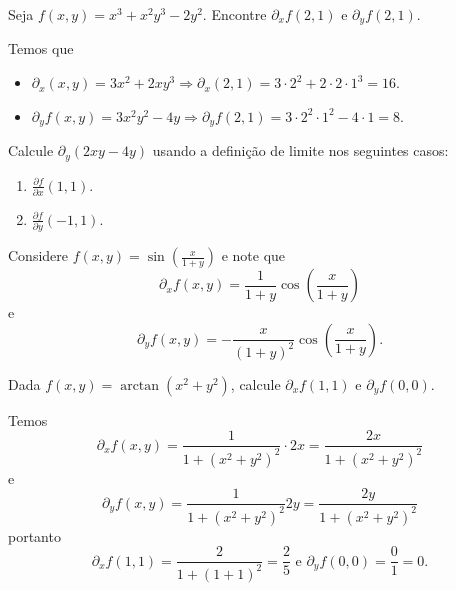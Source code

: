\begin{example}
    Seja \(f(x,y) = x^3 + x^2y^3 -2y^2\). Encontre \(\partial_xf(2,1)\) e \(\partial_yf(2,1)\).

    Temos que
        \begin{itemize}
            \item \(\partial_x(x,y) = 3x^2 + 2xy^3 \Rightarrow \partial_x(2,1) = 3\cdot2^2 + 2\cdot2\cdot1^3 = 16.\)
            \item \(\partial_yf(x,y) = 3x^2y^2 - 4y \Rightarrow \partial_yf(2,1) = 3\cdot2^2\cdot1^2 - 4\cdot1 = 8.\)
        \end{itemize}
\end{example}

\begin{exercise}
    Calcule \(\partial_y (2xy - 4y)\) usando a definição de limite nos seguintes casos:
        \begin{enumerate}
            \item \(\frac{\partial f}{\partial x}(1,1)\).
            \item \(\frac{\partial f}{\partial y}(-1,1)\).
        \end{enumerate}
\end{exercise}

\begin{example}
    Considere \(f(x,y) = \sin\left( \frac{x}{1+y} \right)\) e note que \[\partial_x f(x,y) = \frac{1}{1+y}\cos\left( \frac{x}{1+y} \right)\] e \[\partial_y f(x,y) = -\frac{x}{(1+y)^2}\cos\left( \frac{x}{1+y} \right).\]
\end{example}

\begin{example}
    Dada \(f(x,y) = \arctan(x^2 + y^2)\), calcule \(\partial_xf(1,1)\) e \(\partial_yf(0,0)\).

    Temos \[\partial_xf(x,y) = \frac{1}{1+(x^2+y^2)^2}\cdot 2x = \frac{2x}{1+(x^2+y^2)^2}\] e \[\partial_yf(x,y) = \frac{1}{1+(x^2+y^2)^2}2y = \frac{2y}{1+(x^2+y^2)^2}\] portanto \[\partial_xf(1,1) = \frac{2}{1+(1+1)^2} = \frac{2}{5} \text{ e } \partial_yf(0,0) = \frac{0}{1} = 0.\]
\end{example}

